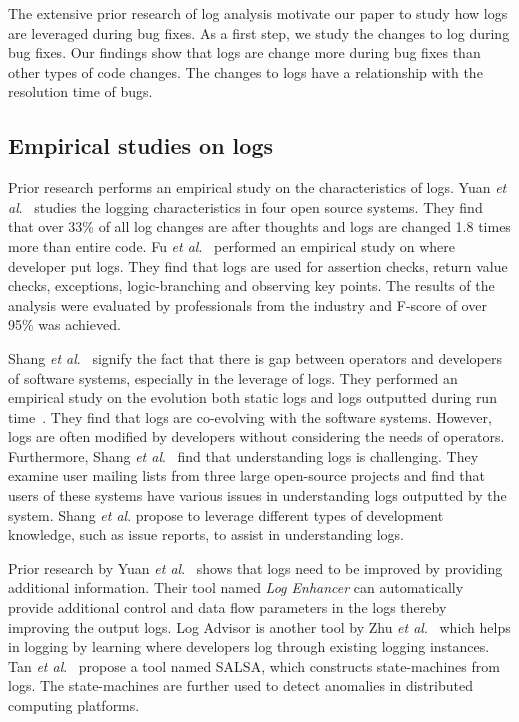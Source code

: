 
The extensive prior research of log analysis motivate our paper to study how logs are leveraged during bug fixes. As a first step, we study the changes to log during bug fixes. Our findings show that logs are change more during bug fixes than other types of code changes. The changes to logs have a relationship with the resolution time of bugs.



\subsection{Empirical studies on logs}



Prior research performs an empirical study on the characteristics of logs. Yuan \textsl{et al$.$}~\cite{Characterizinglogs} studies the logging characteristics in four open source systems. They find that over 33\% of all log changes are after thoughts and logs are changed 1.8 times more than entire code. Fu \textsl{et al$.$}~\cite{Fu1} performed an empirical study on where developer put logs. They find that logs are used for assertion checks, return value checks, exceptions, logic-branching and observing key points. The results of the analysis were evaluated by professionals from the industry and F-score of over 95\% was achieved. 


Shang \textsl{et al$.$}~\cite{IanGap} signify the fact that there is gap between operators and developers of software systems, especially in the leverage of logs. They performed an empirical study on the evolution both static logs and logs outputted during run time~\cite{EMSEIAN,PaperIanCIIII}. They find that logs are co-evolving with the software systems. However, logs are often modified by developers without considering the needs of operators. Furthermore, Shang\textsl{ et al$.$}~\cite{IanIcesm} find that understanding logs is challenging. They examine user mailing lists from three large open-source projects and find that users of these systems have various issues in understanding logs outputted by the system. Shang\textsl{ et al$.$} propose to leverage different types of development knowledge, such as issue reports, to assist in understanding logs. 

Prior research by Yuan\textsl{ et al$.$}~\cite{Yuan} shows that logs need to be improved by providing additional information. Their tool named \emph{Log Enhancer} can automatically provide additional control and data flow parameters in the logs thereby improving the output logs. Log Advisor is another tool by Zhu \emph{et al$.$}~\cite{zhu2015learning} which helps in logging by learning where developers log through existing logging instances. Tan \textsl{et al}$.$~\cite{TanSalsa} propose a tool named SALSA, which constructs state-machines from logs. The state-machines are further used to detect anomalies in distributed computing platforms. 

